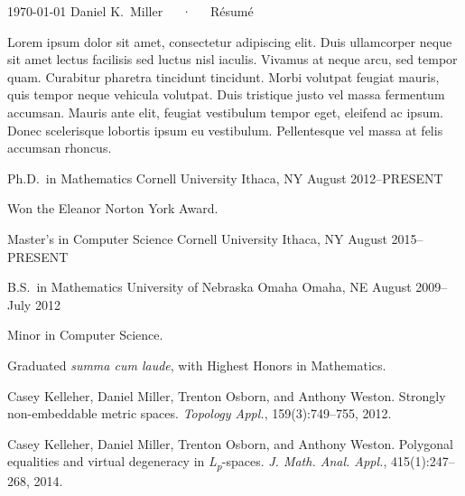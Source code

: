 \documentclass[11pt, letterpaper]{awesome-cv}
\begin{document}
\makecvheader

\makecvfooter
  {\today}
  {Daniel K.~Miller~~~·~~~Résumé}
  {\thepage}



\begin{cvparagraph}

Lorem ipsum dolor sit amet, consectetur adipiscing elit. Duis ullamcorper neque sit amet lectus facilisis sed luctus nisl iaculis. Vivamus at neque arcu, sed tempor quam. Curabitur pharetra tincidunt tincidunt. Morbi volutpat feugiat mauris, quis tempor neque vehicula volutpat. Duis tristique justo vel massa fermentum accumsan. Mauris ante elit, feugiat vestibulum tempor eget, eleifend ac ipsum. Donec scelerisque lobortis ipsum eu vestibulum. Pellentesque vel massa at felis accumsan rhoncus.
\end{cvparagraph}






\begin{cventries}

\cventry
	{Ph.D.~in Mathematics}
	{Cornell University}
	{Ithaca, NY}
	{August 2012--PRESENT}
	{
		\begin{cvitems}
			\item{Won the Eleanor Norton York Award.}
		\end{cvitems}
	}
	
\cventry
	{Master's in Computer Science}
	{Cornell University}
	{Ithaca, NY}
	{August 2015--PRESENT}
	{}
	
\cventry
	{B.S.~in Mathematics}
	{University of Nebraska Omaha}
	{Omaha, NE}
	{August 2009--July 2012}
	{
		\begin{cvitems}
			\item{Minor in Computer Science.}
			\item{Graduated \emph{summa cum laude}, with Highest Honors in Mathematics.}
		\end{cvitems}
	}
	
\end{cventries}





\begin{cvparagraph}

Casey Kelleher, Daniel Miller, Trenton Osborn, and Anthony Weston. Strongly non-embeddable metric spaces. \emph{Topology Appl.}, 159(3):749--755, 2012. 

Casey Kelleher, Daniel Miller, Trenton Osborn, and Anthony Weston. Polygonal equalities and virtual degeneracy in \emph{L\textsubscript{p}}-spaces. \emph{J. Math. Anal. Appl.}, 415(1):247--268, 2014. 
\end{cvparagraph}
\end{document}
